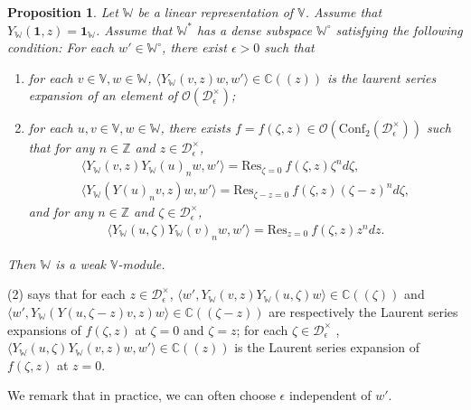 \documentclass[12pt,b5paper,notitlepage]{report}
\theoremstyle{definition}
\theoremstyle{plain}
\newtheorem{pp}[df]{Proposition}
\newcommand{\mc}{\mathcal}
\newcommand{\id}{\mathbf{1}}
\newcommand{\Conf}{\mathrm{Conf}}
\newcommand{\Res}{\mathrm{Res}}
\newcommand{\bk}[1]{\langle {#1}\rangle}
\newcommand{\scr}{\mathscr}
\newcommand{\Vbb}{\mathbb V}
\newcommand{\Wbb}{\mathbb W}
\newcommand{\Cbb}{\mathbb C}
\newcommand{\Zbb}{\mathbb Z}
\numberwithin{equation}{section}
\begin{document}
\begin{pp}\label{lb94}
Let $\Wbb$ be a linear representation of $\Vbb$. Assume that  $Y_\Wbb(\id,z)=\id_\Wbb$. Assume  that $\Wbb^*$ has a dense subspace $\Wbb^\circ$ satisfying the following condition: For each $w'\in\Wbb^\circ$, there exist $\epsilon>0$ such that
\begin{enumerate}[label=(\arabic*)]
	\item for each $v\in\Vbb,w\in\Wbb$, $\bk{Y_\Wbb(v,z)w,w'}\in\Cbb((z))$ is the laurent series expansion of an element of $\scr O(\mc D_\epsilon^\times)$;
	\item for each $u,v\in\Vbb,w\in\Wbb$, there exists $f=f(\zeta,z)\in\scr O(\Conf_2(\mc D_\epsilon^\times))$ such that for any $n\in\Zbb$ and $z\in\mc D_\epsilon^\times$,
	\begin{gather}
		\bk{Y_\Wbb(v,z)Y_\Wbb(u)_nw,w'}=\Res_{\zeta=0}~f(\zeta,z)\zeta^nd\zeta,\label{eq193}\\
		\bk{Y_\Wbb(Y(u)_nv,z)w,w'}=\Res_{\zeta-z=0}~f(\zeta,z)(\zeta-z)^nd\zeta,\label{eq194}
	\end{gather}
	and for any $n\in\Zbb$ and $\zeta\in\mc D_\epsilon^\times$,
	\begin{gather}
		\bk{Y_\Wbb(u,\zeta)Y_\Wbb(v)_nw,w'}=\Res_{z=0}~f(\zeta,z)z^ndz.\label{eq195}
	\end{gather}
\end{enumerate}
Then $\Wbb$ is a weak $\Vbb$-module.
\end{pp}

(2) says that for each $z\in\mc D_\epsilon^\times$, $\bk{w',Y_\Wbb(v,z)Y_\Wbb(u,\zeta)w}\in\Cbb((\zeta))$ and $\bk{w',Y_\Wbb(Y(u,\zeta-z)v,z)w}\in\Cbb((\zeta-z))$ are respectively the Laurent series expansions of $f(\zeta,z)$ at $\zeta=0$ and $\zeta=z$; for each $\zeta\in\mc D_\epsilon^\times$
, $\bk{Y_\Wbb(u,\zeta)Y_\Wbb(v,z)w,w'}\in\Cbb((z))$ is the Laurent series expansion of $f(\zeta,z)$ at $z=0$.

We remark that in practice, we can often choose $\epsilon$ independent of $w'$.
\end{document}
